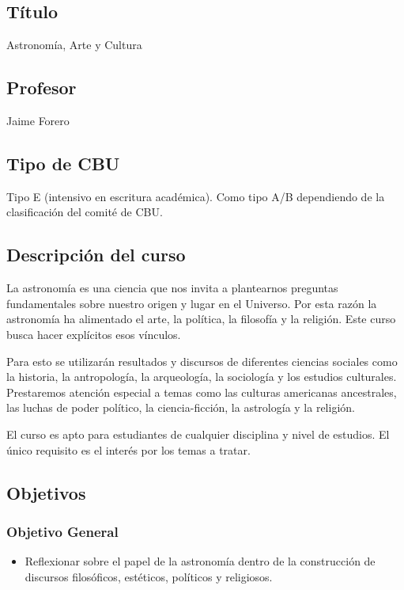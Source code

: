 \documentclass[12pt]{report}
\begin{document}
\subsection*{\bf T\'itulo}
Astronom\'ia, Arte y Cultura\\

\subsection*{\bf Profesor}
Jaime Forero\\

\subsection*{Tipo de CBU}
Tipo E (intensivo en escritura acad\'emica). 
Como tipo A/B dependiendo de la clasificaci\'on del comit\'e de CBU.  

\subsection*{Descripci\'on del curso}
La astronom\'ia es una ciencia que nos invita a plantearnos preguntas
fundamentales sobre nuestro origen y lugar en el Universo. 
Por esta raz\'on la astronom\'ia ha alimentado el
arte, la pol\'itica, la filosof\'ia y la religi\'on. Este curso busca
hacer expl\'icitos esos v\'inculos.

Para esto se utilizar\'an resultados y discursos de diferentes
ciencias sociales como la historia, la antropolog\'ia, la arqueolog\'ia, la
sociolog\'ia y los estudios culturales. Prestaremos atenci\'on
especial a temas como las culturas americanas  ancestrales, las luchas
de poder pol\'itico, la ciencia-ficci\'on, la astrolog\'ia y la
religi\'on.  

El curso es apto para estudiantes de cualquier disciplina y nivel de
estudios. El \'unico requisito es el inter\'es por los temas a
tratar. 
\subsection*{Objetivos}

\subsubsection*{Objetivo General}
\begin{itemize}
\item Reflexionar sobre el papel de la astronom\'ia dentro de la
  construcci\'on de discursos filos\'oficos,
  est\'eticos, pol\'iticos y religiosos. 
\end{itemize}
\end{document}
